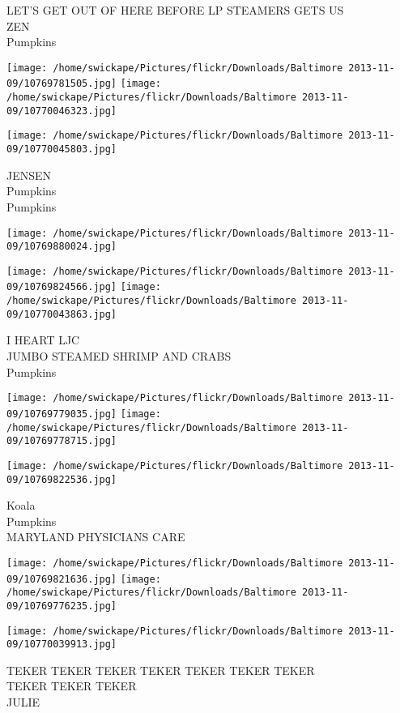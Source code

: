 \documentclass[10pt,letterpaper]{article}
\begin{document}
LET'S GET OUT OF HERE BEFORE LP STEAMERS GETS US\\
ZEN\\
Pumpkins
\pagebreak

\texttt{[image: /home/swickape/Pictures/flickr/Downloads/Baltimore 2013-11-09/10769781505.jpg]}
\texttt{[image: /home/swickape/Pictures/flickr/Downloads/Baltimore 2013-11-09/10770046323.jpg]}

\texttt{[image: /home/swickape/Pictures/flickr/Downloads/Baltimore 2013-11-09/10770045803.jpg]}

JENSEN\\
Pumpkins\\
Pumpkins
\pagebreak

\texttt{[image: /home/swickape/Pictures/flickr/Downloads/Baltimore 2013-11-09/10769880024.jpg]}

\vspace{0.25in}
\texttt{[image: /home/swickape/Pictures/flickr/Downloads/Baltimore 2013-11-09/10769824566.jpg]}
\texttt{[image: /home/swickape/Pictures/flickr/Downloads/Baltimore 2013-11-09/10770043863.jpg]}

I HEART LJC\\
JUMBO STEAMED SHRIMP AND CRABS\\
Pumpkins
\pagebreak

\texttt{[image: /home/swickape/Pictures/flickr/Downloads/Baltimore 2013-11-09/10769779035.jpg]}
\texttt{[image: /home/swickape/Pictures/flickr/Downloads/Baltimore 2013-11-09/10769778715.jpg]}

\vspace{0.25in}
\texttt{[image: /home/swickape/Pictures/flickr/Downloads/Baltimore 2013-11-09/10769822536.jpg]}

Koala\\
Pumpkins\\
MARYLAND PHYSICIANS CARE
\pagebreak

\texttt{[image: /home/swickape/Pictures/flickr/Downloads/Baltimore 2013-11-09/10769821636.jpg]}
\texttt{[image: /home/swickape/Pictures/flickr/Downloads/Baltimore 2013-11-09/10769776235.jpg]}

\vspace{0.25in}
\texttt{[image: /home/swickape/Pictures/flickr/Downloads/Baltimore 2013-11-09/10770039913.jpg]}

TEKER TEKER TEKER TEKER TEKER TEKER TEKER\\
TEKER TEKER TEKER\\
JULIE
\pagebreak
\end{document}
